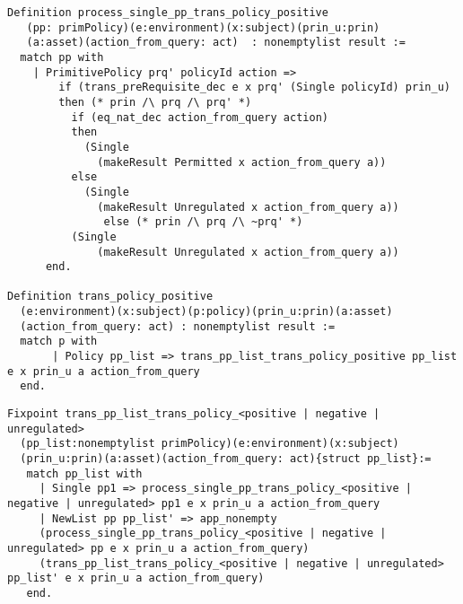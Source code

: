 \begin{lstlisting}
Definition process_single_pp_trans_policy_positive 
   (pp: primPolicy)(e:environment)(x:subject)(prin_u:prin)
   (a:asset)(action_from_query: act)  : nonemptylist result :=
  match pp with
    | PrimitivePolicy prq' policyId action =>
        if (trans_preRequisite_dec e x prq' (Single policyId) prin_u)
        then (* prin /\ prq /\ prq' *)
          if (eq_nat_dec action_from_query action)
          then
            (Single 
              (makeResult Permitted x action_from_query a))
          else
            (Single 
              (makeResult Unregulated x action_from_query a))
               else (* prin /\ prq /\ ~prq' *)
          (Single 
              (makeResult Unregulated x action_from_query a))
      end.

Definition trans_policy_positive
  (e:environment)(x:subject)(p:policy)(prin_u:prin)(a:asset)
  (action_from_query: act) : nonemptylist result :=
  match p with
       | Policy pp_list => trans_pp_list_trans_policy_positive pp_list e x prin_u a action_from_query
  end.

\end{lstlisting}

\begin{lstlisting}
Fixpoint trans_pp_list_trans_policy_<positive | negative | unregulated> 
  (pp_list:nonemptylist primPolicy)(e:environment)(x:subject)
  (prin_u:prin)(a:asset)(action_from_query: act){struct pp_list}:=
   match pp_list with
     | Single pp1 => process_single_pp_trans_policy_<positive | negative | unregulated> pp1 e x prin_u a action_from_query
     | NewList pp pp_list' => app_nonempty
	 (process_single_pp_trans_policy_<positive | negative | unregulated> pp e x prin_u a action_from_query) 
	 (trans_pp_list_trans_policy_<positive | negative | unregulated> pp_list' e x prin_u a action_from_query)
   end.
\end{lstlisting}


